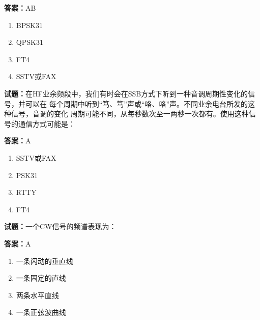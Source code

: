 \documentclass{ctexbook}
\begin{document}
\textbf{答案：}AB 

\begin{enumerate}[leftmargin=3em]
  \item BPSK31 

  \item QPSK31 

  \item FT4 

  \item SSTV或FAX 

\end{enumerate}





\vspace{1em}

\textbf{试题：}在HF业余频段中，我们有时会在SSB方式下听到一种音调周期性变化的信号，并可以在
每个周期中听到“笃、笃”声或“咯、咯”声。不同业余电台所发的这种信号，音调的变化
周期可能不同，从每秒数次至一两秒一次都有。使用这种信号的通信方式可能是： 

\textbf{答案：}A 

\begin{enumerate}[leftmargin=3em]
  \item SSTV或FAX 

  \item PSK31 

  \item RTTY 

  \item FT4 

\end{enumerate}






\vspace{1em}

\textbf{试题：}一个CW信号的频谱表现为： 

\textbf{答案：}A 

\begin{enumerate}[leftmargin=3em]
  \item 一条闪动的垂直线 

  \item 一条固定的直线 

  \item 两条水平直线 

  \item 一条正弦波曲线 

\end{enumerate}
\end{document}

